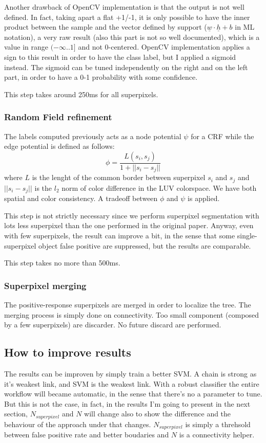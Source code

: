 \documentclass[a4paper,titlepaget]{article}
\begin{document}
Another drawback of OpenCV implementation is that the output is not well defined. In fact, taking apart a flat +1/-1, it is only possible to have the inner product between the sample and the vector defined by support ($\underline{w}\cdot\underline{h}+b$ in ML notation), a very raw result (also this part is not so well documented), which is a value in range $(-\infty..1]$ and not 0-centered. OpenCV implementation applies a sign to this result in order to have the class label, but I applied a sigmoid instead. The sigmoid can be tuned independently on the right and on the left part, in order to have a 0-1 probability with some confidence.

This step takes around 250ms for all superpixels.

\subsubsection{Random Field refinement}
The labels computed previously acts as a node potential $\psi$ for a CRF while the edge potential is defined as follows:
\begin{equation*}
	\phi = \frac{L(s_i,s_j)}{1+||s_i - s_j||}
\end{equation*}
where $L$ is the lenght of the common border between superpixel $s_i$ and $s_j$ and $||s_i - s_j||$ is the $l_2$ norm of color difference in the LUV colorspace. We have both spatial and color consistency. A tradeoff between $\phi$ and $\psi$ is applied.

This step is not strictly necessary since we perform superpixel segmentation with lots less superpixel than the one performed in the original paper. Anyway, even with few superpixels, the result can improve a bit, in the sense that some single-superpixel object false positive are suppressed, but the results are comparable. 

This step takes no more than 500ms.

\subsubsection{Superpixel merging}
The positive-response superpixels are merged in order to localize the tree. The merging process is simply done on connectivity. Too small component (composed by a few superpixels) are discarder. No future discard are performed.

\subsection{How to improve results}
The results can be improven by simply train a better SVM. A chain is strong as it's weakest link, and SVM is the weakest link. With a robust classifier the entire workflow will became automatic, in the sense that there's no a parameter to tune. But this is not the case, in fact, in the results I'm going to present in the next section, $N_{superpixel}$ and $N$ will change also to show the difference and the behaviour of the approach under that changes. $N_{superpixel}$ is simply a threhsold between false positive rate and better boudaries and $N$ is a connectivity helper.
\end{document}
